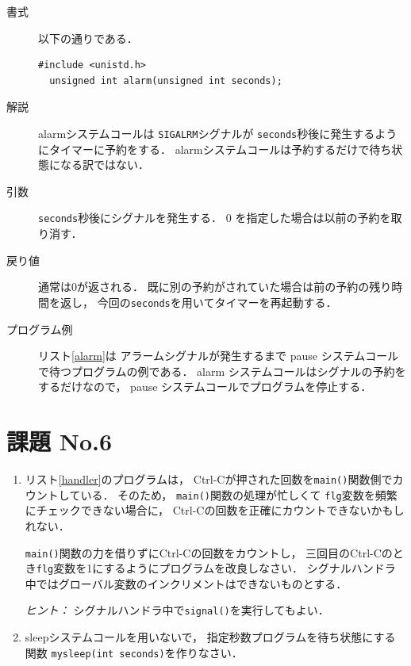 \begin{description}
\item[書式] 以下の通りである．

\begin{lstlisting}[numbers=none]
  #include <unistd.h>
  unsigned int alarm(unsigned int seconds);
\end{lstlisting}

\item[解説]
  alarmシステムコールは
  \texttt{SIGALRM}シグナルが
  \texttt{seconds}秒後に発生するようにタイマーに予約をする．
  alarmシステムコールは予約するだけで待ち状態になる訳ではない．

\item[引数]
  \texttt{seconds}秒後にシグナルを発生する．
  0 を指定した場合は以前の予約を取り消す．

\item[戻り値]
  通常は0が返される．
  既に別の予約がされていた場合は前の予約の残り時間を返し，
  今回の\texttt{seconds}を用いてタイマーを再起動する．

\item[プログラム例]
  リスト\ref{alarm}は
  アラームシグナルが発生するまで
  pause システムコールで待つプログラムの例である．
  alarm システムコールはシグナルの予約をするだけなので，
  pause システムコールでプログラムを停止する．

  

\end{description}

\section*{課題 No.6}
\begin{enumerate}
\item リスト\ref{handler}のプログラムは，
  Ctrl-Cが押された回数を\texttt{main()}関数側でカウントしている．
  そのため，
  \texttt{main()}関数の処理が忙しくて
  \texttt{flg}変数を頻繁にチェックできない場合に，
  Ctrl-Cの回数を正確にカウントできないかもしれない．
  
  \texttt{main()}関数の力を借りずにCtrl-Cの回数をカウントし，
  三回目のCtrl-Cのとき\texttt{flg}変数を1にするようにプログラムを改良しなさい．
  シグナルハンドラ中ではグローバル変数のインクリメントはできないものとする．

  \emph{ヒント：} シグナルハンドラ中で\texttt{signal()}を実行してもよい．

\item sleepシステムコールを用いないで，
  指定秒数プログラムを待ち状態にする関数
  \texttt{mysleep(int seconds)}を作りなさい．

\end{enumerate}
